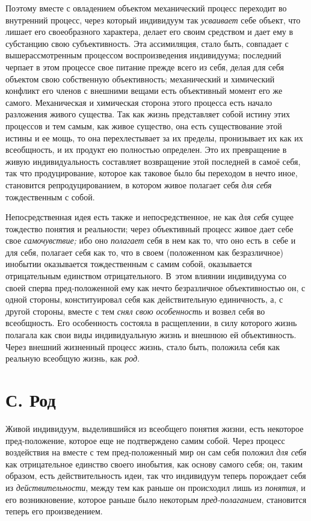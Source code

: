 Поэтому вместе с овладением объектом механический процесс
переходит во внутренний процесс, через который индивидуум так
{\em усваивает} себе
объект, что лишает его своеобразного характера, делает его своим средством
и дает ему в субстанцию свою субъективность. Эта ассимиляция, стало быть,
совпадает с вышерассмотренным процессом воспроизведения индивидуума;
последний черпает в этом процессе свое питание прежде всего из себя,
делая для себя объектом свою собственную объективность;
механический и химический конфликт его членов с внешними вещами есть
объективный момент его же самого. Механическая и химическая сторона этого
процесса есть начало разложения живого существа. Так как жизнь представляет
собой истину этих процессов и тем самым, как живое существо, она есть
существование этой истины и ее мощь, то она перехлестывает за их пределы,
пронизывает их как их всеобщность, и их продукт ею полностью определен. Это
их превращение в живую индивидуальность составляет возвращение этой
последней в самоё себя, так что продуцирование, которое как таковое было бы
переходом в нечто иное, становится репродуцированием, в котором живое
полагает себя {\em для себя}
тождественным с собой.

Непосредственная идея есть также и непосредственное, не как
{\em для себя} сущее
тождество понятия и реальности; через объективный процесс живое дает себе
свое {\em самочувствие;} ибо оно {\em полагает}
себя в нем как то, что оно есть в~себе и для себя, полагает
себя как то, что в своем (положенном как безразличное) инобытии оказывается
тождественным с самим собой, оказывается отрицательным единством
отрицательного. В~этом влиянии индивидуума со своей сперва пред-положенной
ему как нечто безразличное объективностью он, с одной стороны,
конституировал себя как действительную единичность, а, с другой стороны,
вместе с тем {\em снял свою
особенность} и возвел себя во всеобщность. Его особенность
состояла в расщеплении, в силу которого жизнь полагала как свои виды
индивидуальную жизнь и внешнюю ей объективность. Через внешний жизненный
процесс жизнь, стало быть, положила себя как реальную всеобщую жизнь, как
{\em род}.

\section[С. Род]{С. Род}
Живой индивидуум, выделившийся из всеобщего понятия жизни,
есть некоторое пред-положение, которое еще не подтверждено самим собой.
Через процесс воздействия на вместе с тем пред-положенный мир он сам себя
положил {\em для себя}
как отрицательное единство своего инобытия, как основу самого
себя; он, таким образом, есть действительность идеи, так что индивидуум
теперь порождает себя из
{\em действительности},
между тем как раньше он происходил лишь из
{\em понятия}, и его
возникновение, которое раньше было некоторым
{\em пред-полаганием},
становится теперь его произведением.


